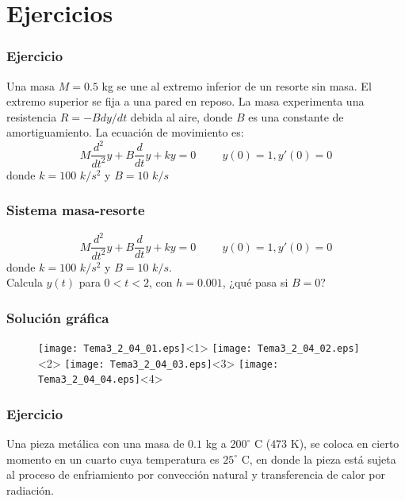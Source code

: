 \section{Ejercicios}
\begin{frame}
\frametitle{Ejercicio}
Una masa $M = 0.5$ kg se une al extremo inferior de un resorte sin masa. El extremo superior se fija a una pared en reposo. La masa experimenta una resistencia $R = -B dy/dt$ debida al aire, donde $B$ es una constante de amortiguamiento. La ecuación de movimiento es:
\[ M \dfrac{d^{2}}{dt^{2}}y + B \dfrac{d}{dt}y + ky = 0 \hspace{1cm}y(0)=1,y'(0)=0 \]
donde $k=100$ $k/s^{2}$ y $B=10$ $k/s$
\end{frame}
\begin{frame}
\frametitle{Sistema masa-resorte}
\begin{center}
\end{center}
\[ M \dfrac{d^{2}}{dt^{2}}y + B \dfrac{d}{dt}y + ky = 0 \hspace{1cm}y(0)=1,y'(0)=0 \]
donde $k=100$ $k/s^{2}$ y $B=10$ $k/s$.
\\
\medskip
Calcula $y(t)$ para $0<t<2$, con $h=0.001$, ¿qué pasa si $B=0$?
\end{frame}
\begin{frame}
\frametitle{Solución gráfica}
\begin{figure}
	\centering
	\texttt{[image: Tema3\_2\_04\_01.eps]}<1> 
	\texttt{[image: Tema3\_2\_04\_02.eps]}<2>
	\texttt{[image: Tema3\_2\_04\_03.eps]}<3>
	\texttt{[image: Tema3\_2\_04\_04.eps]}<4>
\end{figure}
\end{frame}
\begin{frame}
\frametitle{Ejercicio}
Una pieza metálica con una masa de $0.1$ kg a $200^{\circ}$ C  ($473$ K), se coloca en cierto momento en un cuarto cuya temperatura es $25^{\circ}$ C, en donde la pieza está sujeta al proceso de enfriamiento por convección natural y transferencia de calor por radiación.
\end{frame}
